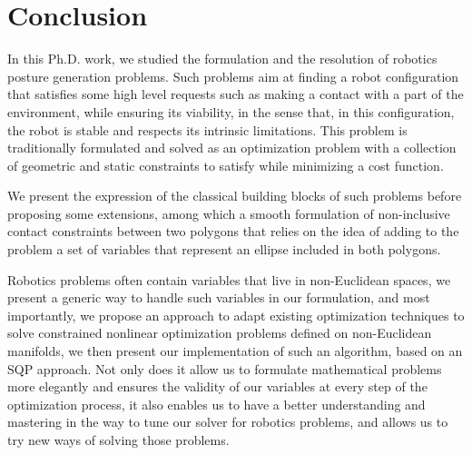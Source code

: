

\chapter*{Conclusion}
\label{cha:conclusion}

In this Ph.D. work, we studied the formulation and the resolution of robotics posture generation problems.
Such problems aim at finding a robot configuration that satisfies some high level requests such as making a contact with a part of the environment, while ensuring its viability, in the sense that, in this configuration, the robot is stable and respects its intrinsic limitations.
This problem is traditionally formulated and solved as an optimization problem with a collection of geometric and static constraints to satisfy while minimizing a cost function.

We present the expression of the classical building blocks of such problems before proposing some extensions, among which a smooth formulation of non-inclusive contact constraints between two polygons that relies on the idea of adding to the problem a set of variables that represent an ellipse included in both polygons.

Robotics problems often contain variables that live in non-Euclidean spaces, we present a generic way to handle such variables in our formulation, and most importantly, we propose an approach to adapt existing optimization techniques to solve constrained nonlinear optimization problems defined on non-Euclidean manifolds, we then present our implementation of such an algorithm, based on an SQP approach.
Not only does it allow us to formulate mathematical problems more elegantly and ensures the validity of our variables at every step of the optimization process, it also enables us to have a better understanding and mastering in the way to tune our solver for robotics problems, and allows us to try new ways of solving those problems.


